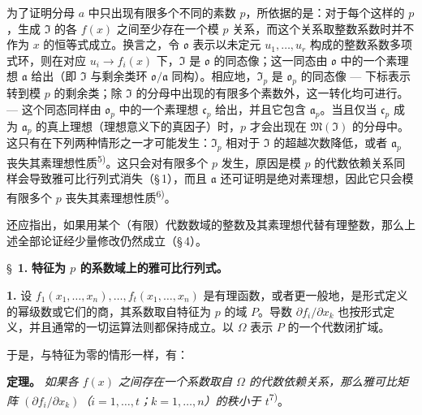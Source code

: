 \documentclass[11pt]{article}
\begin{document}
为了证明分母 $a$ 中只出现有限多个不同的素数 $p$，所依据的是：对于每个这样的 $p$，生成 $\mathfrak{I}$ 的各 $f(x)$ 之间至少存在一个模 $p$ 关系，而这个关系取整数系数时并不作为 $x$ 的恒等式成立。换言之，令 $\mathfrak{o}$ 表示以未定元 $u_1,\ldots,u_r$ 构成的整数系数多项式环，则在对应 $u_i \to f_i(x)$ 下，$\mathfrak{I}$ 是 $\mathfrak{o}$ 的同态像；这一同态由 $\mathfrak{o}$ 中的一个素理想 $\mathfrak{a}$ 给出（即 $\mathfrak{I}$ 与剩余类环 $\mathfrak{o}/\mathfrak{a}$ 同构）。相应地，$\mathfrak{I}_p$ 是 $\mathfrak{o}_p$ 的同态像 --- 下标表示转到模 $p$ 的剩余类；除 $\mathfrak{I}$ 的分母中出现的有限多个素数外，这一转化均可进行。--- 这个同态同样由 $\mathfrak{o}_p$ 中的一个素理想 $\mathfrak{c}_p$ 给出，并且它包含 $\mathfrak{a}_p$。当且仅当 $\mathfrak{c}_p$ 成为 $\mathfrak{a}_p$ 的真上理想（理想意义下的真因子）时，$p$ 才会出现在 $\mathfrak{M}(\mathfrak{I})$ 的分母中。这只有在下列两种情形之一才可能发生：$\mathfrak{I}_p$ 相对于 $\mathfrak{I}$ 的超越次数降低，或者 $\mathfrak{a}_p$ 丧失其素理想性质\textsuperscript{5)}。这只会对有限多个 $p$ 发生，原因是模 $p$ 的代数依赖关系同样会导致雅可比行列式消失（\S\,1），而且 $\mathfrak{a}$ 还可证明是绝对素理想，因此它只会模有限多个 $p$ 丧失其素理想性质\textsuperscript{6)}。

还应指出，如果用某个（有限）代数数域的整数及其素理想代替有理整数，那么上述全部论证经少量修改仍然成立（\S\,4）。

\bigskip
\S~\textbf{1.}
\textbf{特征为 $p$ 的系数域上的雅可比行列式。}

\smallskip

\noindent\textbf{1.}
设 $f_1(x_1,\ldots,x_n),\ldots,f_t(x_1,\ldots,x_n)$ 是有理函数，或者更一般地，是形式定义的幂级数或它们的商，其系数取自特征为 $p$ 的域 $P$。导数 $\partial f_i/\partial x_k$ 也按形式定义，并且通常的一切运算法则都保持成立。以 $\Omega$ 表示 $P$ 的一个代数闭扩域。

于是，与特征为零的情形一样，有：

\noindent\textbf{定理。}
\textit{如果各 $f(x)$ 之间存在一个系数取自 $\Omega$ 的代数依赖关系，那么雅可比矩阵 $(\partial f_i/\partial x_k)$（$i=1,\ldots,t$；$k=1,\ldots,n$）的秩小于 $t$}\textsuperscript{7)}。
\end{document}

